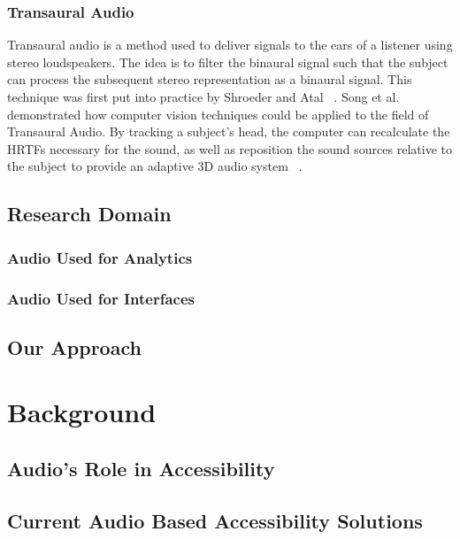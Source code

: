 \documentclass[12pt]{report}
\begin{document}
\subsection {Transaural Audio}
Transaural audio is a method used to deliver signals to the ears of a listener using stereo loudspeakers.
The idea is to filter the binaural signal such that the subject can process the subsequent stereo
representation as a binaural signal.  This technique was first put into practice by Shroeder and Atal
~\cite{schroeder1963computer, schroeder1970digital}.
Song et al. demonstrated how computer vision techniques could be applied to the field of Transaural Audio. By tracking a subject's head, the computer can recalculate the HRTFs necessary for the sound,
as well as reposition the sound sources relative to the subject to provide an adaptive 3D audio system
~\cite{song2010personal}.

\section{ Research Domain}

\subsection { Audio Used for Analytics }
\subsection{ Audio Used for Interfaces }
\section{ Our Approach }

\newpage
\chapter{Background}
\section{ Audio's Role in Accessibility}
\section{ Current Audio Based Accessibility Solutions }
\end{document}

